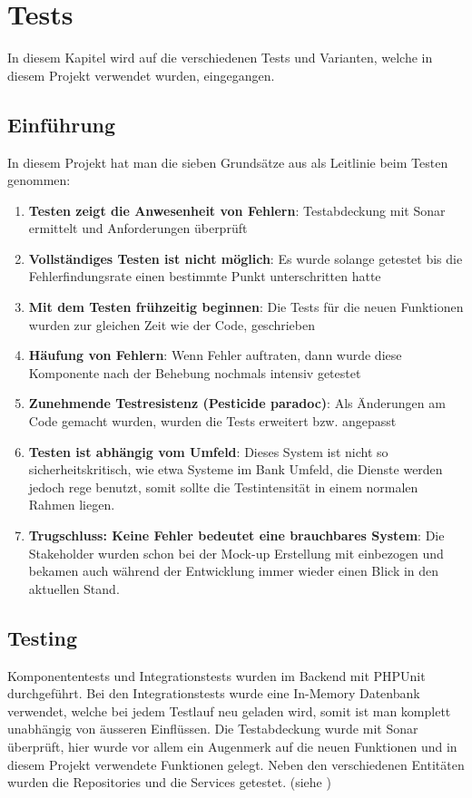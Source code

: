 %
%

\chapter{Tests}\label{chap.tests} 
In diesem Kapitel wird auf die verschiedenen Tests und Varianten, welche in diesem Projekt verwendet wurden, eingegangen.

\section{Einführung}
In diesem Projekt hat man die sieben Grundsätze aus \cite{test_soft_book} als Leitlinie beim Testen genommen:
\begin{enumerate}
\item \textbf{Testen zeigt die Anwesenheit von Fehlern}: Testabdeckung mit Sonar ermittelt und Anforderungen überprüft
\item \textbf{Vollständiges Testen ist nicht möglich}: Es wurde solange getestet bis die Fehlerfindungsrate einen bestimmte Punkt unterschritten hatte
\item \textbf{Mit dem Testen frühzeitig beginnen}: Die Tests für die neuen Funktionen wurden zur gleichen Zeit wie der Code, geschrieben
\item \textbf{Häufung von Fehlern}: Wenn Fehler auftraten, dann wurde diese Komponente nach der Behebung nochmals intensiv getestet
\item \textbf{Zunehmende Testresistenz (Pesticide paradoc)}: Als Änderungen am Code gemacht wurden, wurden die Tests erweitert bzw. angepasst
\item \textbf{Testen ist abhängig vom Umfeld}: Dieses System ist nicht so sicherheitskritisch, wie etwa Systeme im Bank Umfeld, die Dienste werden jedoch rege benutzt, somit sollte die Testintensität in einem normalen Rahmen liegen.
\item \textbf{Trugschluss: Keine Fehler bedeutet eine brauchbares System}: Die Stakeholder wurden schon bei der Mock-up Erstellung mit einbezogen und bekamen auch während der Entwicklung immer wieder einen Blick in den aktuellen Stand.
\end{enumerate}

\section{Testing}
Komponententests und Integrationstests wurden im Backend mit PHPUnit durchgeführt. Bei den Integrationstests wurde eine In-Memory Datenbank verwendet, welche bei jedem Testlauf neu geladen wird, somit ist man komplett unabhängig von äusseren Einflüssen. Die Testabdeckung wurde mit Sonar überprüft, hier wurde vor allem ein Augenmerk auf die neuen Funktionen und in diesem Projekt verwendete Funktionen gelegt. Neben den verschiedenen Entitäten wurden die Repositories und die Services getestet. (siehe \cite{test_soft_book})

